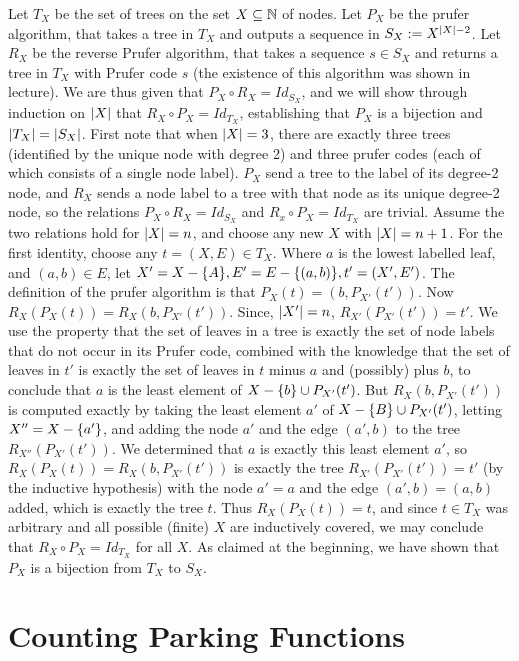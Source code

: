 \documentclass{article}
\begin{document}
Let $T_X$ be the set of trees on the set $X \subseteq \mathbb{N}$ of nodes. Let $P_X$ be the prufer algorithm, that takes a tree in $T_X$ and outputs a sequence in $S_X := X^{\abs{X}-2}$. Let $R_X$ be the reverse Prufer algorithm, that takes a sequence $s \in S_X$ and returns a tree in $T_X$ with Prufer code $s$ (the existence of this algorithm was shown in lecture). We are thus given that $P_X \circ R_X = Id_{S_X}$, and we will show through induction on $\abs{X}$ that $R_X \circ P_X = Id_{T_X}$, establishing that $P_X$ is a bijection and $\abs{T_X} = \abs{S_X}$. First note that when $\abs{X} = 3$, there are exactly three trees (identified by the unique node with degree 2) and three prufer codes (each of which consists of a single node label). $P_X$ send a tree to the label of its degree-2 node, and $R_X$ sends a node label to a tree with that node as its unique degree-2 node, so the relations $P_X \circ R_X = Id_{S_X}$ and $R_x \circ P_X = Id_{T_X}$ are trivial. Assume the two relations hold for $\abs{X} = n$, and choose any new $X$ with $\abs{X} = n+1$. For the first identity, choose any $t =(X, E) \in T_X$. Where $a$ is the lowest labelled leaf, and $(a, b) \in E$, let $X' = X - \{A\}, E' = E - \{(a, b)\}, t' = (X', E')$. The definition of the prufer algorithm is that $P_X(t) = (b, P_{X'}(t'))$. Now $R_X(P_X(t)) = R_X(b, P_{X'}(t'))$. Since, $\abs{X'} = n$, $R_{X'}(P_{X'}(t')) = t'$. We use the property that the set of leaves in a tree is exactly the set of node labels that do not occur in its Prufer code, combined with the knowledge that the set of leaves in $t'$ is exactly the set of leaves in $t$ minus $a$ and (possibly) plus $b$, to conclude that $a$ is the least element of $X - \{b\} \cup P_{X'}(t')$. But $R_X(b, P_{X'}(t'))$ is computed exactly by taking the least element $a'$ of $X - \{B\} \cup P_{X'}(t')$, letting $X'' = X - \{a'\}$, and adding the node $a'$ and the edge $(a', b)$ to the tree $R_{X''}(P_{X'}(t'))$. We determined that $a$ is exactly this least element $a'$, so $R_X(P_X(t)) = R_X(b, P_{X'}(t'))$ is exactly the tree $R_{X'}(P_{X'}(t')) = t'$ (by the inductive hypothesis) with the node $a' = a$ and the edge $(a', b) = (a, b)$ added, which is exactly the tree $t$. Thus $R_X(P_X(t)) = t$, and since $t \in T_X$ was arbitrary and all possible (finite) $X$ are inductively covered, we may conclude that $R_X \circ P_X = Id_{T_X}$ for all $X$. As claimed at the beginning, we have shown that $P_X$ is a bijection from $T_X$ to $S_X$. 

\section{Counting Parking Functions}
\end{document}
